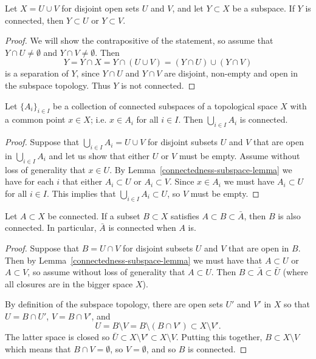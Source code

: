 \begin{lem}
  \label{connectedness-subspace-lemma}
  Let $X = U \cup V$ for disjoint open sets $U$ and $V$, and let $Y \subset X$ be a subspace. If $Y$ is connected, then $Y \subset U$ or $Y \subset V$.
\end{lem}
\begin{proof}
  We will show the contrapositive of the statement, so assume that $Y \cap U \not= \emptyset$ and $Y \cap V \not= \emptyset$. Then
  \[
    Y = Y \cap X = Y \cap (U \cup V) = (Y \cap U) \cup (Y \cap V)
  \]
  is a separation of $Y$, since $Y \cap U$ and $Y \cap V$ are disjoint, non-empty and open in the subspace topology. Thus $Y$ is not connected.
\end{proof}
\begin{thm}
  \label{unions-connected}
  Let $\{A_i\}_{i \in I}$ be a collection of connected subspaces of a topological space $X$ with a common point $x \in X$; i.e. $x \in A_i$ for all $i \in I$. Then $\bigcup_{i \in I} A_i$ is connected.
\end{thm}
\begin{proof}
  Suppose that $\bigcup_{i \in I} A_i = U \cup V$ for disjoint subsets $U$ and $V$ that are open in $\bigcup_{i \in I} A_i$ and let us show that either $U$ or $V$ must be empty. Assume without loss of generality that $x \in U$. By Lemma~\ref{connectedness-subspace-lemma} we have for each $i$ that either $A_i \subset U$ or $A_i \subset V$. Since $x \in A_i$ we must have $A_i \subset U$ for all $i \in I$. This implies that $\bigcup_{i \in I} A_i \subset U$, so $V$ must be empty.
\end{proof}
\begin{thm}
  \label{connected-closures}
  Let $A \subset X$ be connected. If a subset $B \subset X$ satisfies $A \subset B \subset \bar A$, then $B$ is also connected. In particular, $\bar A$ is connected when $A$ is.
\end{thm}
\begin{proof}
  Suppose that $B = U \cap V$ for disjoint subsets $U$ and $V$ that are open in $B$. Then by Lemma~\ref{connectedness-subspace-lemma} we must have that $A \subset U$ or $A \subset V$, so assume without loss of generality that $A \subset U$. Then $B \subset \bar A \subset \bar U$ (where all closures are in the bigger space $X$).
  
  By definition of the subspace topology, there are open sets $U'$ and $V'$ in $X$ so that $U = B \cap U'$, $V = B \cap V'$, and
  \[
    U = B \setminus V = B \setminus (B \cap V') \subset X \setminus V'.
  \]
  The latter space is closed so $\bar U \subset X \setminus V' \subset X \setminus V$. Putting this together, $B \subset X \setminus V$ which means that $B \cap V = \emptyset$, so $V = \emptyset$, and so $B$ is connected.
\end{proof}
